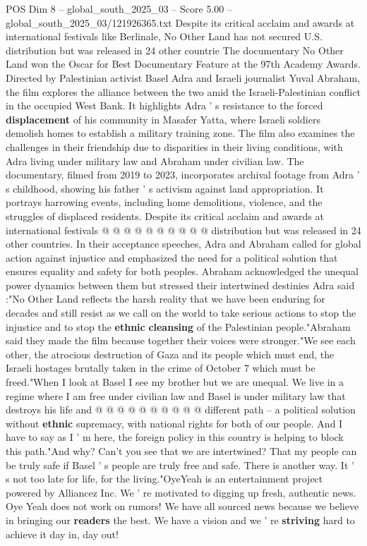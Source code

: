 \begin{textsample}{POS Dim 8 – global\_south\_2025\_03 – Score 5.00 – global\_south\_2025\_03/121926365.txt}  \label{ex:f8_pos_144}
Despite its critical acclaim and awards at international festivals like Berlinale, No Other Land has not secured U.S. distribution but was released in 24 other countrie The documentary No Other Land won the Oscar for Best Documentary Feature at the 97th Academy Awards.
Directed by Palestinian activist Basel Adra and Israeli journalist Yuval Abraham, the film explores the alliance between the two amid the Israeli-Palestinian conflict in the occupied West Bank.
It highlights Adra ' s resistance to the forced \textbf{displacement} of his community in Masafer Yatta, where Israeli soldiers demolish homes to establish a military training zone.
The film also examines the challenges in their friendship due to disparities in their living conditions, with Adra living under military law and Abraham under civilian law.
The documentary, filmed from 2019 to 2023, incorporates archival footage from Adra ' s childhood, showing his father ' s activism against land appropriation.
It portrays harrowing events, including home demolitions, violence, and the struggles of displaced residents.
Despite its critical acclaim and awards at international festivals @ @ @ @ @ @ @ @ @ @ distribution but was released in 24 other countries.
In their acceptance speeches, Adra and Abraham called for global action against injustice and emphasized the need for a political solution that ensures equality and safety for both peoples.
Abraham acknowledged the unequal power dynamics between them but stressed their intertwined destinies Adra said :"No Other Land reflects the harsh reality that we have been enduring for decades and still resist as we call on the world to take serious actions to stop the injustice and to stop the \textbf{ethnic} \textbf{cleansing} of the Palestinian people."Abraham said they made the film because together their voices were stronger."We see each other, the atrocious destruction of Gaza and its people which must end, the Israeli hostages brutally taken in the crime of October 7 which must be freed."When I look at Basel I see my brother but we are unequal.
We live in a regime where I am free under civilian law and Basel is under military law that destroys his life and @ @ @ @ @ @ @ @ @ @ different path -- a political solution without \textbf{ethnic} supremacy, with national rights for both of our people.
And I have to say as I ' m here, the foreign policy in this country is helping to block this path."And why?
Can't you see that we are intertwined?
That my people can be truly safe if Basel ' s people are truly free and safe.
There is another way.
It ' s not too late for life, for the living."OyeYeah is an entertainment project powered by Alliancez Inc.
We ' re motivated to digging up fresh, authentic news.
Oye Yeah does not work on rumors!
We have all sourced news because we believe in bringing our \textbf{readers} the best.
We have a vision and we ' re \textbf{striving} hard to achieve it day in, day out!

\end{textsample}
